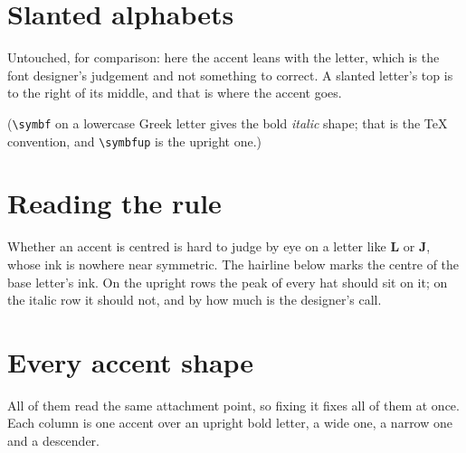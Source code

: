 \section{Slanted alphabets}
\label{sec:slanted}

Untouched, for comparison: here the accent leans with the letter, which is the
font designer's judgement and not something to correct. A slanted letter's top
is to the right of its middle, and that is where the accent goes.

\medskip
{}
\gwblows{\symit}{}
\medskip
{}
\gwblows{\symbfit}{}

\medskip
{}\gwbgreek{\symbf}

\noindent
(\verb|\symbf| on a lowercase Greek letter gives the bold \emph{italic} shape;
that is the TeX convention, and \verb|\symbfup| is the upright one.)

\section{Reading the rule}
\label{sec:rule}

Whether an accent is centred is hard to judge by eye on a letter like
\(\symbf{L}\) or \(\symbf{J}\), whose ink is nowhere near symmetric. The
hairline below marks the centre of the base letter's ink. On the upright rows
the peak of every hat should sit on it; on the italic row it should not, and
by how much is the designer's call.

\medskip
{}
\gwblowsruled{\symup}{}
\medskip
{}
\gwblowsruled{\symbf}{}
\medskip
{}
\gwblowsruled{\symit}{}

\section{Every accent shape}
\label{sec:shapes}

All of them read the same attachment point, so fixing it fixes all of them at
once. Each column is one accent over an upright bold letter, a wide one, a
narrow one and a descender.

\newcommand{\gwbacc}[3]{%
  \mbox{{\footnotesize\ttfamily#2}\hskip 0.35em
        $#1{#3{R}}\;#1{#3{W}}\;#1{#3{l}}\;#1{#3{q}}$}%
  \hspace{1.1em plus 0.5em}}
\newcommand{\gwbaccrow}[1]{%
  \par\medskip{\raggedright\noindent
  \gwbacc{\hat}{hat}{#1}\gwbacc{\check}{check}{#1}\gwbacc{\tilde}{tilde}{#1}%
  \gwbacc{\acute}{acute}{#1}\gwbacc{\grave}{grave}{#1}\gwbacc{\dot}{dot}{#1}%
  \gwbacc{\ddot}{ddot}{#1}\gwbacc{\breve}{breve}{#1}\gwbacc{\bar}{bar}{#1}%
  \gwbacc{\vec}{vec}{#1}\gwbacc{\mathring}{mathring}{#1}\par}}

